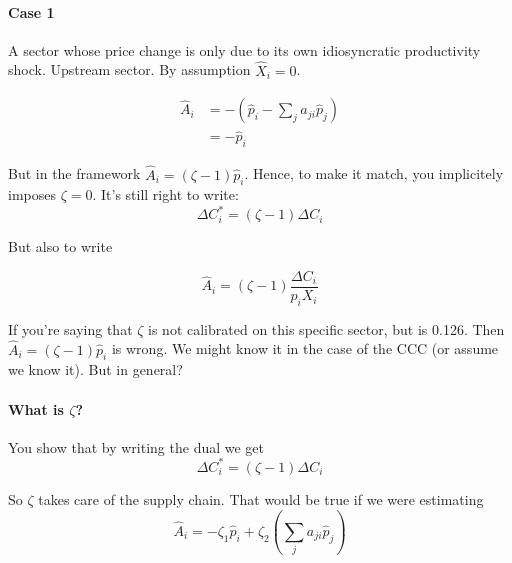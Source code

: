 \documentclass[11pt]{article}
\begin{document}
\paragraph{Case 1}

A sector whose price change is only due to its own idiosyncratic productivity shock. Upstream sector. By assumption $\hat{X}_i=0$.

\begin{align*}
    \hat{A}_i &= -\left(\hat{p}_i - \sum_j a_{ji} \hat{p}_{j}\right)\\
    &=-\hat{p}_i
\end{align*}

But in the framework $ \hat{A}_i=(\zeta-1)\hat{p}_i$. 
Hence, to make it match, you implicitely imposes $\zeta=0$. 
It's still right to write: 
\begin{equation*}
    \Delta C^*_i=(\zeta-1)\Delta C_i
\end{equation*}

But also to write 

\begin{equation*}
   \hat{A}_i=(\zeta-1)\frac{\Delta C_i}{p_iX_i}
\end{equation*}

If you're saying that $\zeta$ is not calibrated on this specific sector, but is 0.126. Then $ \hat{A}_i=(\zeta-1)\hat{p}_i$ is wrong. 
We might know it in the case of the CCC (or assume we know it). But in general?

\paragraph{What is $\zeta$?}
You show that by writing the dual we get
\begin{equation*}
    \Delta C^*_i=(\zeta-1)\Delta C_i
\end{equation*}

So $\zeta$ takes care of the supply chain. That would be true if we were estimating 
\begin{equation*}
    \hat{A}_i =-\zeta_1\hat{p}_i+\zeta_2 \left(\sum_j a_{ji} \hat{p}_{j}\right)
\end{equation*}
\end{document}
